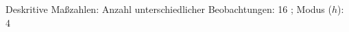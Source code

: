 				\label{tableValues:bstu17}
				\vspace*{-\baselineskip}
                    \begin{noten}
                	    \note{} Deskritive Maßzahlen:
                	    Anzahl unterschiedlicher Beobachtungen: 16%
                	    ; 
                	      Modus ($h$): 4
                     \end{noten}


